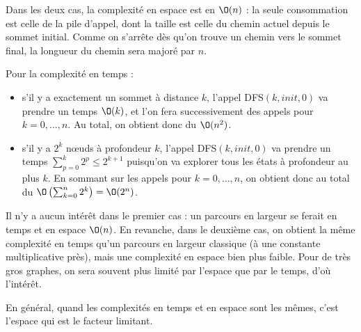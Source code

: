 \begin{ques}
  Dans les deux cas, la complexité en espace est en $\O(n)$ : la seule
  consommation est celle de la pile d'appel, dont la taille est celle
  du chemin actuel depuis le sommet initial. Comme on s'arrête dès qu'on
  trouve un chemin vers le sommet final, la longueur du chemin sera
  majoré par $n$.

  Pour la complexité en temps :
  \begin{itemize}
    \item s'il y a exactement un sommet à distance $k$, l'appel
          \textsc{DFS}$(k, init, 0)$ va prendre un temps $\O(k)$,
          et l'on fera successivement des appels pour $k = 0, \dots, n$.
          Au total, on obtient donc du $\O(n^{2})$.
    \item s'il y a $2^{k}$ nœuds à profondeur $k$, l'appel
          \textsc{DFS}$(k, init, 0)$ va prendre un temps
          $\sum_{p = 0}^{k} 2^{p} \leq 2^{k + 1}$ puisqu'on va
          explorer tous les états à profondeur au plus $k$.
          En sommant sur les appels pour $k = 0, \dots, n$,
          on obtient donc au total du
          $\O\left(\sum_{k = 0}^{n} 2^{k}\right) = \O(2^{n})$.
  \end{itemize}

  Il n'y a aucun intérêt dans le premier cas : un parcours en largeur
  se ferait en temps et en espace $\O(n)$. En revanche, dans le
  deuxième cas, on obtient la même complexité en temps qu'un parcours
  en largeur classique (à une constante multiplicative près), mais
  une complexité en espace bien plus faible. Pour de très gros graphes,
  on sera souvent plus limité par l'espace que par le temps, d'où l'intérêt.

  \begin{rem}
    En général, quand les complexités en temps et en espace sont les
    mêmes, c'est l'espace qui est le facteur limitant.
  \end{rem}
\end{ques}

